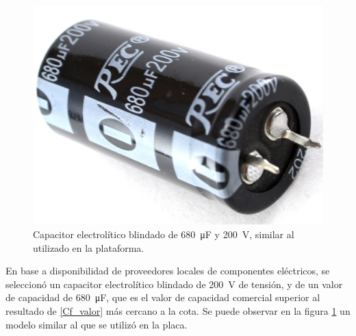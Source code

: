 \begin{figure}[h]
    \centering
    \includegraphics[scale=0.23]{Imagenes/Capacitor Blindado.jpg}
    \caption{Capacitor electrolítico blindado de \SI{680}{\micro\farad} y \SI{200}{\volt}, similar al utilizado en la plataforma.}
    \label{Cf_blindado}
\end{figure}

En base a disponibilidad de proveedores locales de componentes eléctricos, se seleccionó un capacitor electrolítico blindado de \SI{200}{\volt} de tensión, y de un valor de capacidad de \SI{680}{\micro\farad}, que es el valor de capacidad comercial superior al resultado de \ref{Cf_valor} más cercano a la cota. Se puede observar en la figura \ref{Cf_blindado} un modelo similar al que se utilizó en la placa.\\